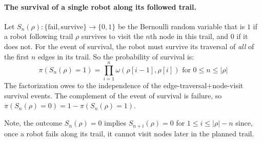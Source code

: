 \documentclass[11pt, oneside]{article}
\begin{document}
\paragraph{The survival of a single robot along its followed trail.}
Let $S_n(\rho) : \{\text{fail}, \text{survive}\} \rightarrow \{0, 1\} $ be the Bernoulli random variable that is $1$ if a robot following trail $\rho$ survives to visit the $n$th node in this trail, and $0$ if it does not. For the event of survival, the robot must survive its traversal of \emph{all} of the first $n$ edges in its trail. So the probability of survival is:
\begin{equation}
	\pi(S_n(\rho) = 1) = \prod_{i=1}^n \omega(\rho[i-1], \rho[i]) \text{ for } 0 \leq n \leq \lvert \rho \rvert %
	\label{eq:pi_S_n}
\end{equation} The factorization owes to the independence of the edge-traversal$+$node-visit survival events.
The complement of the event of survival is failure, so $\pi(S_n(\rho) = 0)=1-\pi(S_n(\rho) = 1)$.

Note, the outcome $S_n(\rho)=0$ implies $S_{n+i}(\rho)=0$ for $1 \leq i \leq \lvert \rho \rvert-n$ since, once a robot fails along its trail, it cannot visit nodes later in the planned trail.
\end{document}
